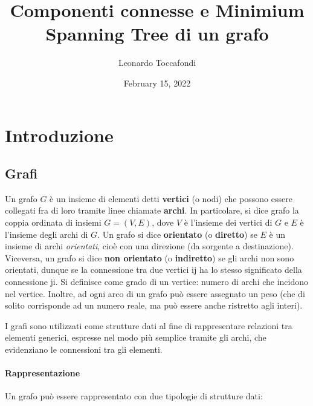 \documentclass[
]{article}
\title{Componenti connesse e Minimium Spanning Tree di un grafo}
\author{Leonardo Toccafondi}
\date{February 15, 2022}
\begin{document}
\maketitle

\hypertarget{introduzione}{%
\section{Introduzione}\label{introduzione}}

\hypertarget{grafi}{%
\subsection{Grafi}\label{grafi}}

Un grafo \(G\) è un insieme di elementi detti \textbf{vertici} (o nodi)
che possono essere collegati fra di loro tramite linee chiamate
\textbf{archi}. In particolare, si dice grafo la coppia ordinata di
insiemi \(G = (V, E)\), dove \(V\) è l'insieme dei vertici di \(G\) e
\(E\) è l'insieme degli archi di \(G\). Un grafo si dice
\textbf{orientato} (o \textbf{diretto}) se \(E\) è un insieme di archi
\emph{orientati}, cioè con una direzione (da sorgente a destinazione).
Viceversa, un grafo si dice \textbf{non orientato} (o
\textbf{indiretto}) se gli archi non sono orientati, dunque se la
connessione tra due vertici ij ha lo stesso significato della
connessione ji. Si definisce come grado di un vertice: numero di archi
che incidono nel vertice. Inoltre, ad ogni arco di un grafo può essere
assegnato un peso (che di solito corrisponde ad un numero reale, ma può
essere anche ristretto agli interi).

I grafi sono utilizzati come strutture dati al fine di rappresentare
relazioni tra elementi generici, espresse nel modo più semplice tramite
gli archi, che evidenziano le connessioni tra gli elementi.

\hypertarget{rappresentazione}{%
\paragraph{Rappresentazione}\label{rappresentazione}}

Un grafo può essere rappresentato con due tipologie di strutture dati:
\end{document}
